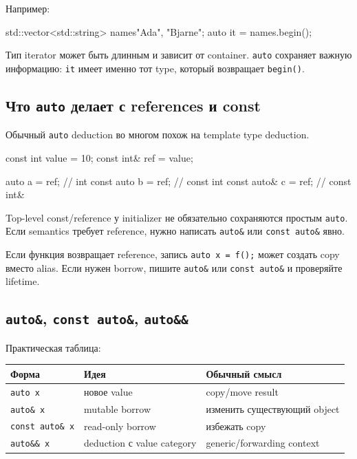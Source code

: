 Например:

\begin{cppcode}
std::vector<std::string> names{"Ada", "Bjarne"};
auto it = names.begin();
\end{cppcode}

Тип iterator может быть длинным и зависит от container. \texttt{auto} сохраняет
важную информацию: \texttt{it} имеет именно тот type, который возвращает
\texttt{begin()}.

\subsection{Что \texttt{auto} делает с references и const}

Обычный \texttt{auto} deduction во многом похож на template type deduction.

\begin{cppcode}
const int value = 10;
const int& ref = value;

auto a = ref;        // int
const auto b = ref;  // const int
const auto& c = ref; // const int&
\end{cppcode}

Top-level const/reference у initializer не обязательно сохраняются простым
\texttt{auto}. Если semantics требует reference, нужно написать
\texttt{auto\&} или \texttt{const auto\&} явно.

\begin{warningbox}
Если функция возвращает reference, запись \texttt{auto x = f();} может создать
copy вместо alias. Если нужен borrow, пишите \texttt{auto\&} или
\texttt{const auto\&} и проверяйте lifetime.
\end{warningbox}

\subsection{\texttt{auto\&}, \texttt{const auto\&}, \texttt{auto\&\&}}

Практическая таблица:

\begin{center}
\begin{tabularx}{\textwidth}{L{0.22\textwidth}YY}
\toprule
Форма & Идея & Обычный смысл \\
\midrule
\texttt{auto x} & новое value & copy/move result \\
\texttt{auto\& x} & mutable borrow & изменить существующий object \\
\texttt{const auto\& x} & read-only borrow & избежать copy \\
\texttt{auto\&\& x} & deduction с value category & generic/forwarding context \\
\bottomrule
\end{tabularx}
\end{center}

